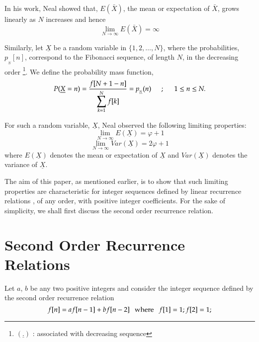 \begin{multicols}{2}
In his work, Neal \cite{art2-key01} showed that, $E(\bar{X})$, the mean or expectation of $\bar{X}$, grows linearly as $N$ increases and hence 
\begin{equation}
\lim_{N\rightarrow \infty} E(\bar{X}) = \infty\label{eq-2.5}
\end{equation} 

Similarly, let $\underline{X}$ be a random variable in $\{1,2, \ldots, N\}$, where the probabilities, $p_{_{\underline{N}}}[n]$, correspond to the Fibonacci sequence, of length $N$, in the decreasing order \footnote{${(\underline{.})}$ : associated with decreasing sequence}. We define the probability mass function,
\begin{equation}
P(\underline{X} = n) = \frac{f[N+1-n]}{\displaystyle{\sum_{k =1}^N f[k]}} = p_{_{\underline{N}}}(n) \hspace{0.2in} ; \hspace{0.2in} 1 \leq n\leq N.\label{eq-2.6}
 \end{equation}

For such a random variable, $\underline{X}$, Neal \cite{neal} observed the following limiting properties:
\begin{equation}
\lim_{N\rightarrow \infty} E(\underline{X}) = \varphi + 1\label{eq-2.7}
\end{equation}
\begin{equation}
\lim_{N\rightarrow \infty} Var(\underline{X}) = 2\varphi + 1\label{eq-2.8}
\end{equation}
where $E(\underline{X})$ denotes the mean or expectation of $\underline{X}$ and $Var(\underline{X})$ denotes the variance of $\underline{X}$.

The aim of this paper, as mentioned earlier, is to show that such limiting properties are characteristic for integer sequences defined by linear recurrence relations , of any order, with positive integer coefficients. For the sake of simplicity, we shall first discuss the second order recurrence relation. 
 
\section{Second Order Recurrence Relations}\label{section-3} 

Let $a$, $b$ be any two positive integers and consider the integer sequence defined by the second order recurrence relation
\begin{equation}
f[n] = a f[n-1] + b f[n-2] \hspace{0.1in}  \textup{where} \hspace{0.1in}  f[1] = 1; f[2]= 1;\label{eq-3.1}
\end{equation}
 

\end{multicols}
